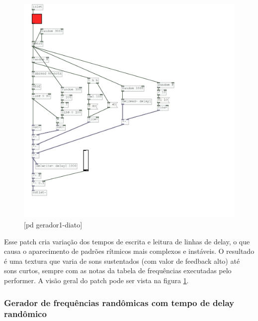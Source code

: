 \documentclass{ppgmus}
\begin{document}
\begin{figure}
\includegraphics[scale=.6]{gerador-sintese1-diato}
\caption{[pd gerador1-diato]}
\label{gerador1diato}
\end{figure}


Esse patch cria variação dos tempos de escrita e leitura de linhas de delay, o que causa o
aparecimento de padrões rítmicos mais complexos e instáveis.
O resultado é uma textura que varia de sons sustentados (com valor de feedback alto) até
sons curtos, sempre com as notas da tabela de frequências executadas pelo performer.
A visão geral do patch pode ser vista na figura \ref{gerador1diato}.


\subsubsection{Gerador de frequências randômicas com tempo de delay randômico}
\end{document}
